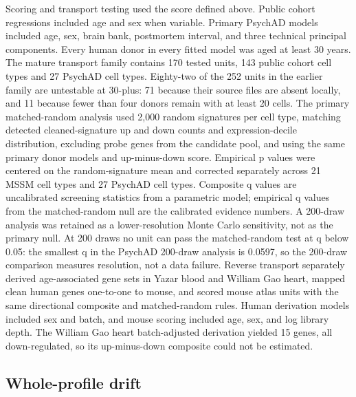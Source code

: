 \documentclass[11pt]{article}
\begin{document}
Scoring and transport testing used the score defined above. Public cohort regressions included age and sex when variable. Primary PsychAD models included age, sex, brain bank, postmortem interval, and three technical principal components. Every human donor in every fitted model was aged at least 30 years. The mature transport family contains 170 tested units, 143 public cohort cell types and 27 PsychAD cell types. Eighty-two of the 252 units in the earlier family are untestable at 30-plus: 71 because their source files are absent locally, and 11 because fewer than four donors remain with at least 20 cells. The primary matched-random analysis used 2,000 random signatures per cell type, matching detected cleaned-signature up and down counts and expression-decile distribution, excluding probe genes from the candidate pool, and using the same primary donor models and up-minus-down score. Empirical p values were centered on the random-signature mean and corrected separately across 21 MSSM cell types and 27 PsychAD cell types. Composite q values are uncalibrated screening statistics from a parametric model; empirical q values from the matched-random null are the calibrated evidence numbers. A 200-draw analysis was retained as a lower-resolution Monte Carlo sensitivity, not as the primary null. At 200 draws no unit can pass the matched-random test at q below 0.05: the smallest q in the PsychAD 200-draw analysis is 0.0597, so the 200-draw comparison measures resolution, not a data failure. Reverse transport separately derived age-associated gene sets in Yazar blood and William Gao heart, mapped clean human genes one-to-one to mouse, and scored mouse atlas units with the same directional composite and matched-random rules. Human derivation models included sex and batch, and mouse scoring included age, sex, and log library depth. The William Gao heart batch-adjusted derivation yielded 15 genes, all down-regulated, so its up-minus-down composite could not be estimated.

\subsection*{Whole-profile drift}
\end{document}
